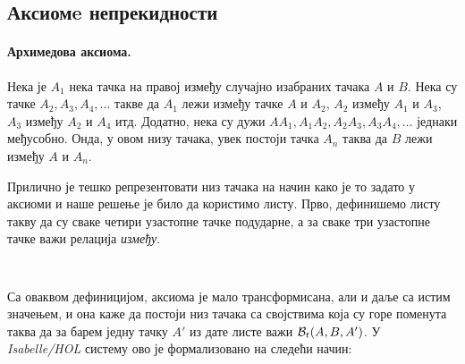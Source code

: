 \subsection{Аксиомe непрекидности}

\paragraph{Архимедова аксиома.}
Нека је $A_1$ нека тачка на правој између случајно изабраних тачака $A$
и $B$. Нека су тачке $A_2, A_3, A_4, \ldots$ такве да $A_1$ лежи
између тачке $A$ и $A_2$, $A_2$ између $A_1$ и $A_3$, $A_3$ између
$A_2$ и $A_4$ итд. Додатно, нека су дужи $AA_1, A_1A_2, A_2A_3,
A_3A_4, \ldots$ једнаки међусобно. Онда, у овом низу тачака, увек
постоји тачка $A_n$ таква да $B$ лежи између $A$ и $A_n$.

Прилично је тешко репрезентовати низ тачака на начин како је то задато
у аксиоми и наше решење је било да користимо листу. Прво, дефинишемо
листу такву да су сваке четири узастопне тачке подударне, а за сваке
три узастопне тачке важи релација \emph{између}.

{\tt
\begin{tabbing}
\hspace{5mm}\=assumes\ \=\kill
\textbf{definition} \\
\> "}congruentl $l \longrightarrow$ length\ $l \ge 3\ \wedge$\\
\>\>  $\forall i.\ 0 \le i\ \wedge\ i+2 <$ length\ $l \longrightarrow$ \\
\>\>  $\congrh{(l\ !\ i)}{(l\ !\ (i+1))}{(l\ !\ (i+1))}{(l\ !\ (i+2))}\ \wedge $\\
\>\>  $\beth{(l\ !\ i)}{(l\ !\ (i+1))}{(l\ !\ (i+2))}$"}
\end{tabbing}
}

Са оваквом дефиницијом, аксиома је мало трансформисана, али и даље са
истим значењем, и она каже да постоји низ тачака са својствима која су
горе поменута таква да за барем једну тачку $A'$ из дате листе важи
$\mathcal{B}_t(A, B, A')$. У \emph{Isabelle/HOL} систему ово је формализовано
на следећи начин:

{\tt
\begin{tabbing}
\hspace{5mm}\=\kill
\textbf{lemma} "}$\beth{A}{A_1}{B}\ \longrightarrow$\\
\> $(\exists l.\ $congruentl $(A\ \#\ A1\ \#\ l)\ \wedge\ (\exists i.\ \beth{A}{B}{(l\ !\ i)}))$"}
\end{tabbing}
}

